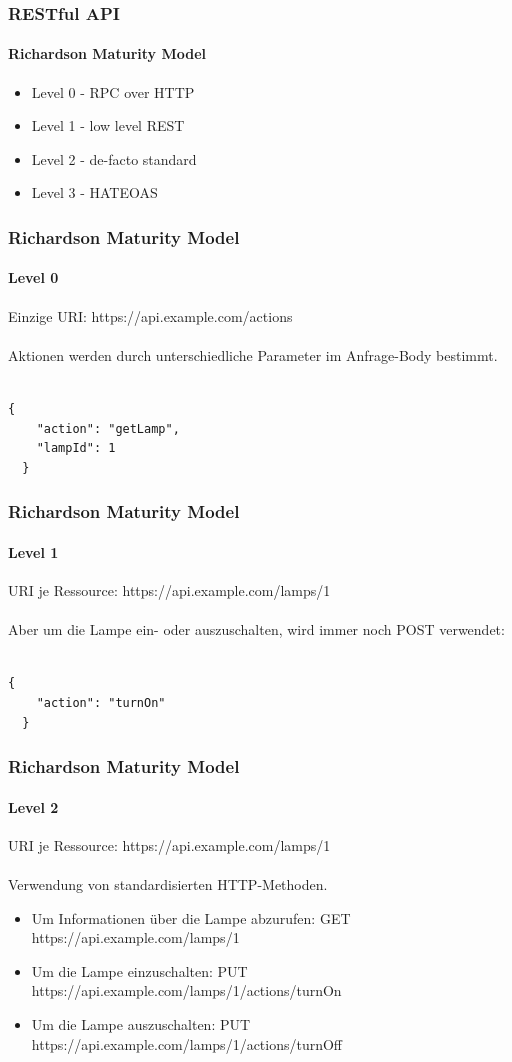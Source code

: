 \begin{frame}
  \frametitle{RESTful API}
  \framesubtitle{Richardson Maturity Model}
  \begin{itemize}
    \item Level 0 - RPC over HTTP
    \item Level 1 - low level REST
    \item Level 2 - de-facto standard
    \item Level 3 - HATEOAS
  \end{itemize}
\end{frame}

\begin{frame}[fragile]
  \frametitle{Richardson Maturity Model}
  \framesubtitle{Level 0}
  Einzige URI: https://api.example.com/actions
  \\\\
  Aktionen werden durch unterschiedliche Parameter im Anfrage-Body bestimmt.
  \\\\
  \begin{minipage}{\textwidth}
  \begin{lstlisting}[caption={Level 0},captionpos=b,label={lst:level_0}]
  {
    "action": "getLamp",
    "lampId": 1
  }
  \end{lstlisting}
  \end{minipage}
\end{frame}

\begin{frame}[fragile]
  \frametitle{Richardson Maturity Model}
  \framesubtitle{Level 1}
  URI je Ressource: https://api.example.com/lamps/1
  \\\\
  Aber um die Lampe ein- oder auszuschalten, wird immer noch POST verwendet:
  \\\\
  \noindent\begin{minipage}{\textwidth}
  \begin{lstlisting}[caption={Level 1},captionpos=b,label={lst:level_1}]
  {
    "action": "turnOn"
  }
  \end{lstlisting}
  \end{minipage}
\end{frame}

\begin{frame}[fragile]
  \frametitle{Richardson Maturity Model}
  \framesubtitle{Level 2}
  URI je Ressource: https://api.example.com/lamps/1
  \\\\
  Verwendung von standardisierten HTTP-Methoden.
  \begin{itemize}
  \item Um Informationen über die Lampe abzurufen: GET https://api.example.com/lamps/1
  \item  Um die Lampe einzuschalten: PUT https://api.example.com/lamps/1/actions/turnOn
  \item Um die Lampe auszuschalten: PUT https://api.example.com/lamps/1/actions/turnOff
  \end{itemize}
\end{frame}

